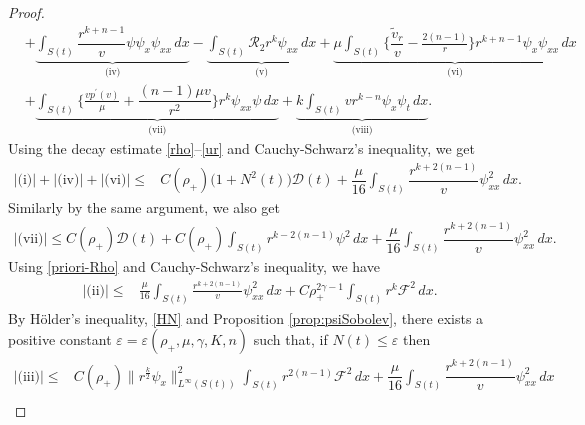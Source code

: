 \documentclass[a4paper,12pt,draft]{article}
\theoremstyle{remark}
\def\vt{\tilde{v}}
\def\ep{\varepsilon}
\def\mD{\mathcal{D}}
\def\mF{\mathcal{F}}
\def\mR{\mathcal{R}}
\begin{document}
\begin{proof}
\begin{align}
        & + \underbrace{\int_{S(t)}\!\! \dfrac{r^{k+n-1}}{v} \psi \psi_x \psi_{xx} \, dx}_{\textrm{(iv)}} - \underbrace{\int_{S(t)} \mR_2 r^k \psi_{xx}\, dx}_{\textrm{(v)}} + \underbrace{\mu \int_{S(t)}\!\! \big\{ \dfrac{\vt_r}{v} - \frac{2(n-1)}{r} \big\} r^{k+n-1} \psi_x \psi_{xx}\, dx}_{\textrm{(vi)}} \nonumber\\ 
        & + \underbrace{\int_{S(t)}\!\! \big\{ \frac{v p^{\prime}(v)}{\mu} + \dfrac{(n-1)\mu v}{r^2} \big\} r^{k} \psi_{xx} \psi\, dx}_{\textrm{(vii)}} + \underbrace{k \int_{S(t)}\! v r^{k-n} \psi_x \psi_t \, dx}_{\textrm{(viii)}}.\label{ddtpsix} 
    \end{align}
    Using the decay estimate \eqref{rho}--\eqref{ur} and Cauchy-Schwarz's inequality, we get
    \begin{align*}
        |\textrm{(i)}| + |\textrm{(iv)}| +|\textrm{(vi)}| \le & C(\rho_{+})\big(1+N^2(t)\big) \mD(t) + \dfrac{\mu}{16} \int_{S(t)}\!\!\!\dfrac{r^{k+2(n-1)}}{v} \psi_{xx}^2 \, dx .
    \end{align*}
    Similarly by the same argument, we also get
    \begin{align*}
        |\textrm{(vii)}| \le C(\rho_{+}) \mD(t) + C(\rho_{+})\int_{S(t)} r^{k-2(n-1)} \psi^2 \, dx  + \dfrac{\mu}{16} \int_{S(t)}\!\!\!\dfrac{r^{k+2(n-1)}}{v} \psi_{xx}^2 \, dx .
    \end{align*}
    Using \eqref{priori-Rho} and Cauchy-Schwarz's inequality, we have
    \begin{align*}
        |\textrm{(ii)}| %
        \le & \frac{\mu}{16}\int_{S(t)} \frac{r^{k+2(n-1)}}{v} \psi_{xx}^2 \, dx + C \rho_{+}^{2\gamma-1} \int_{S(t)} r^k \mF^2 \, dx.
    \end{align*}
    By H\"older's inequality, \eqref{HN} and Proposition \ref{prop:psiSobolev}, there exists a positive constant $\ep=\ep(\rho_+,\mu,\gamma,K,n)$ such that, if $N(t)\le \ep$ then
    \begin{align*}
        |\textrm{(iii)}| \le& C(\rho_{+})\|r^{\frac{k}{2}} \psi_x\|_{L^{\infty}(S(t))}^2 \int_{S(t)}\!\! r^{2(n-1)} \mF^2\, dx   + \dfrac{\mu}{16} \int_{S(t)}\!\! \dfrac{r^{k+2(n-1)}}{v} \psi_{xx}^2\, dx\\

\end{align*}
\end{proof}
\end{document}
